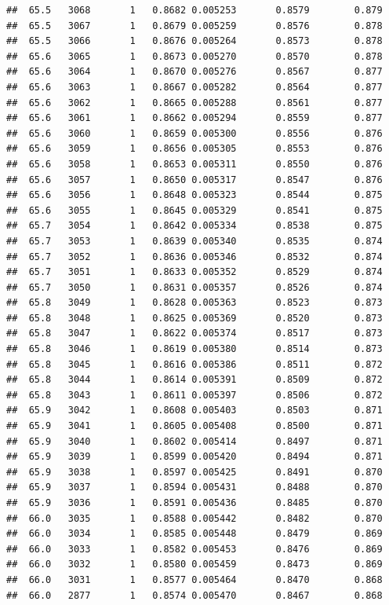 \documentclass[
]{book}
\begin{document}
\begin{verbatim}
##  65.5   3068       1   0.8682 0.005253       0.8579        0.879
##  65.5   3067       1   0.8679 0.005259       0.8576        0.878
##  65.5   3066       1   0.8676 0.005264       0.8573        0.878
##  65.6   3065       1   0.8673 0.005270       0.8570        0.878
##  65.6   3064       1   0.8670 0.005276       0.8567        0.877
##  65.6   3063       1   0.8667 0.005282       0.8564        0.877
##  65.6   3062       1   0.8665 0.005288       0.8561        0.877
##  65.6   3061       1   0.8662 0.005294       0.8559        0.877
##  65.6   3060       1   0.8659 0.005300       0.8556        0.876
##  65.6   3059       1   0.8656 0.005305       0.8553        0.876
##  65.6   3058       1   0.8653 0.005311       0.8550        0.876
##  65.6   3057       1   0.8650 0.005317       0.8547        0.876
##  65.6   3056       1   0.8648 0.005323       0.8544        0.875
##  65.6   3055       1   0.8645 0.005329       0.8541        0.875
##  65.7   3054       1   0.8642 0.005334       0.8538        0.875
##  65.7   3053       1   0.8639 0.005340       0.8535        0.874
##  65.7   3052       1   0.8636 0.005346       0.8532        0.874
##  65.7   3051       1   0.8633 0.005352       0.8529        0.874
##  65.7   3050       1   0.8631 0.005357       0.8526        0.874
##  65.8   3049       1   0.8628 0.005363       0.8523        0.873
##  65.8   3048       1   0.8625 0.005369       0.8520        0.873
##  65.8   3047       1   0.8622 0.005374       0.8517        0.873
##  65.8   3046       1   0.8619 0.005380       0.8514        0.873
##  65.8   3045       1   0.8616 0.005386       0.8511        0.872
##  65.8   3044       1   0.8614 0.005391       0.8509        0.872
##  65.8   3043       1   0.8611 0.005397       0.8506        0.872
##  65.9   3042       1   0.8608 0.005403       0.8503        0.871
##  65.9   3041       1   0.8605 0.005408       0.8500        0.871
##  65.9   3040       1   0.8602 0.005414       0.8497        0.871
##  65.9   3039       1   0.8599 0.005420       0.8494        0.871
##  65.9   3038       1   0.8597 0.005425       0.8491        0.870
##  65.9   3037       1   0.8594 0.005431       0.8488        0.870
##  65.9   3036       1   0.8591 0.005436       0.8485        0.870
##  66.0   3035       1   0.8588 0.005442       0.8482        0.870
##  66.0   3034       1   0.8585 0.005448       0.8479        0.869
##  66.0   3033       1   0.8582 0.005453       0.8476        0.869
##  66.0   3032       1   0.8580 0.005459       0.8473        0.869
##  66.0   3031       1   0.8577 0.005464       0.8470        0.868
##  66.0   2877       1   0.8574 0.005470       0.8467        0.868

\end{verbatim}
\end{document}
